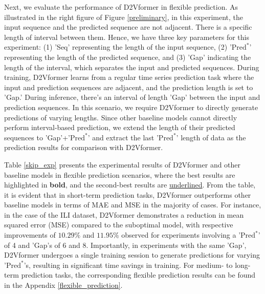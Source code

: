 \documentclass{article}
\begin{document}
Next, we evaluate the performance of D2Vformer in flexible prediction. 
As illustrated in the right figure of Figure \ref{preliminary}, in this experiment, the input sequence and the predicted sequence are not adjacent. There is a specific length of interval between them. Hence, we have three key parameters for this experiment: (1) 'Seq' representing the length of the input sequence, (2) '$\text{Pred}^*$' representing the length of the predicted sequence, and (3) 'Gap' indicating the length of the interval, which separates the input and predicted sequences. 
During training, D2Vformer learns from a regular time series prediction task where the input and prediction sequences are adjacent,  and the prediction length is set to 'Gap.' During inference, there's an interval of length 'Gap' between the input and prediction sequences. In this scenario, we require D2Vformer to directly generate predictions of varying lengths.
Since other baseline models cannot directly perform interval-based prediction, we extend the length of their predicted sequences to 'Gap'+'$\text{Pred}^*$' and extract the last '$\text{Pred}^*$' length of data as the prediction results for comparison with D2Vformer.

Table \ref{skip_exp} presents the experimental results of D2Vformer and other baseline models in flexible prediction scenarios, where the best results are highlighted in \textbf{bold}, and the second-best results are \underline{underlined}. 
From the table, it is evident that in short-term prediction tasks, D2Vformer outperforms other baseline models in terms of MAE and MSE in the majority of cases.
For instance, in the case of the ILI dataset, D2Vformer demonstrates a reduction in mean squared error (MSE) compared to the suboptimal model, with respective improvements of $10.29\%$ and $11.95\%$ observed for experiments involving a '$\text{Pred}^*$' of 4 and 'Gap's of 6 and 8. Importantly, in experiments with the same 'Gap', D2Vformer undergoes a single training session to generate predictions for varying '$\text{Pred}^*$'s, resulting in significant time savings in training. 
For medium- to long-term prediction tasks, the corresponding flexible prediction results can be found in the Appendix \ref{flexible_prediction}.



\end{document}
